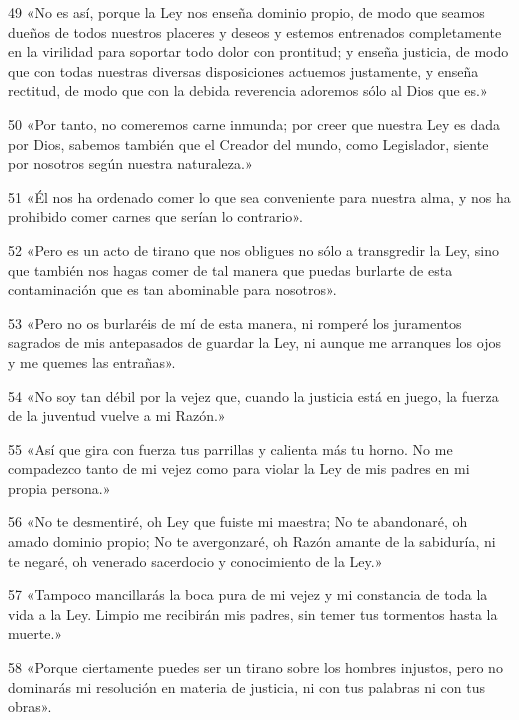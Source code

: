 \par 49 «No es así, porque la Ley nos enseña dominio propio, de modo que seamos dueños de todos nuestros placeres y deseos y estemos entrenados completamente en la virilidad para soportar todo dolor con prontitud; y enseña justicia, de modo que con todas nuestras diversas disposiciones actuemos justamente, y enseña rectitud, de modo que con la debida reverencia adoremos sólo al Dios que es.»

\par 50 «Por tanto, no comeremos carne inmunda; por creer que nuestra Ley es dada por Dios, sabemos también que el Creador del mundo, como Legislador, siente por nosotros según nuestra naturaleza.»

\par 51 «Él nos ha ordenado comer lo que sea conveniente para nuestra alma, y ​​nos ha prohibido comer carnes que serían lo contrario».

\par 52 «Pero es un acto de tirano que nos obligues no sólo a transgredir la Ley, sino que también nos hagas comer de tal manera que puedas burlarte de esta contaminación que es tan abominable para nosotros».

\par 53 «Pero no os burlaréis de mí de esta manera, ni romperé los juramentos sagrados de mis antepasados ​​de guardar la Ley, ni aunque me arranques los ojos y me quemes las entrañas».

\par 54 «No soy tan débil por la vejez que, cuando la justicia está en juego, la fuerza de la juventud vuelve a mi Razón.»

\par 55 «Así que gira con fuerza tus parrillas y calienta más tu horno. No me compadezco tanto de mi vejez como para violar la Ley de mis padres en mi propia persona.»

\par 56 «No te desmentiré, oh Ley que fuiste mi maestra; No te abandonaré, oh amado dominio propio; No te avergonzaré, oh Razón amante de la sabiduría, ni te negaré, oh venerado sacerdocio y conocimiento de la Ley.»

\par 57 «Tampoco mancillarás la boca pura de mi vejez y mi constancia de toda la vida a la Ley. Limpio me recibirán mis padres, sin temer tus tormentos hasta la muerte.»

\par 58 «Porque ciertamente puedes ser un tirano sobre los hombres injustos, pero no dominarás mi resolución en materia de justicia, ni con tus palabras ni con tus obras».

